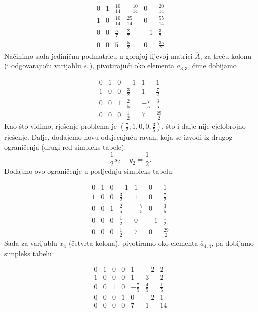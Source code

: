 \documentclass[a4paper, utf8, 11pt, colorlinks]{book}
\begin{document}
$$
\begin{array}{ccccc|c}
    0    &  1  &  \frac{10}{14} &  -\frac{10}{14}  &  0 & \frac{20}{14}                  \\
    1    &  0  &  \frac{10}{14} &   \frac{25}{14}  &  0 & \frac{55}{14}\\ 
    0    &  0  & \frac{5}{7}    &   \frac{2}{7}    &  -1 & \frac{3}{7}  \\
     \hline 
    0    &  0  &  5             &    \frac{5}{2}   &  0 &    \frac{35}{2}
\end{array}
$$
Načinimo sada jediničnu podmatricu u gornjoj lijevoj matrici $\overline{A}$, za treću kolonu (i odgovarajuću varijablu $s_1$), pivotirajući oko elementa $\overline{a}_{3,3}$, čime dobijamo 

$$
\begin{array}{ccccc|c}
    0    &  1  &   0 &   -1  &            1 & 1                  \\
    1    &  0  &  0 &    \frac{3}{2}  &  1 & \frac{7}{2}\\ 
    0    &  0  &  1  &   \frac{2}{5}    &  -\frac{7}{5} & \frac{3}{5}  \\
     \hline 
    0    &  0  &  0   &    \frac{1}{2}  &  7  &    \frac{29}{2}
\end{array}
$$
Kao što vidimo, rješenje problema je $(\frac{7}{2}, 1, 0, 0, \frac{3}{5})$, što i dalje nije cjelobrojno rješenje. Dalje, dodajemo novu odsjecajuću ravan, koja se izvodi iz drugog ograničenja (drugi red simpleks tabele): 
$$ \frac{1}{2} s_2 - y_2 = \frac{1}{2}.$$
Dodajmo ovo ograničenje u posljednju simpleks tabelu:

$$
\begin{array}{cccccc|c}
    0    &  1  &   0 &   -1  &            1 & 0 & 1                  \\
    1    &  0  &  0 &    \frac{3}{2}    &  1 & 0 &  \frac{7}{2}\\ 
    0    &  0  &  1  &   \frac{2}{5}    &  -\frac{7}{5} &  0 & \frac{3}{5}  \\
    0    & 0   &  0  &   \frac{1}{2}    & 0     & -1 & \frac{1}{2} \\
     \hline 
    0    &  0  &  0   &    \frac{1}{2}  &  7  &   0 &  \frac{29}{2}
\end{array}
$$
Sada za varijablu $x_4$ (četvrta kolona), pivotiramo oko elementa $\overline{a}_{4,4}$, pa dobijamo simpleks tabelu 

$$
\begin{array}{cccccc|c}
0 &  1   &  0  &  0  &    1             &    -2           &   2         \\
1 &  0   &  0  &  0  &    1             &     3           &   2         \\
0 &  0   &  1  &  0  &   -\frac{7}{5}   &     \frac{4}{5} &   \frac{1}{5}\\
0 &  0   &  0  &  1  &   0              &    -2           &   1   \\ \hline
0 &  0   &  0  &  0  &   7              &     1           &   14
\end{array}
$$
\end{document}
